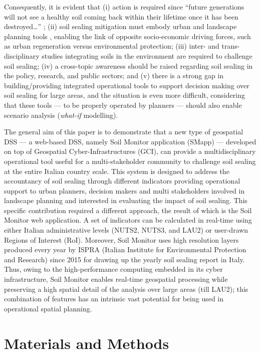 \documentclass[APA,LATO1COL,doublespace]{WileyNJD-v2}
\begin{document}
Consequently, it is evident that 
(i) action is required since ``future generations will not see a healthy soil coming back within their lifetime once it has been destroyed\dots'' \citep{SWD12}; 
(ii) soil sealing mitigation must embody urban and landscape planning tools \citep{Artmann14}, enabling the link of opposite socio-economic driving forces, such as urban regeneration versus environmental protection; 
(iii) inter- and trans-disciplinary studies integrating soils in the environment are required to challenge soil sealing;
(iv) a cross-topic awareness should be raised regarding soil sealing in the policy, research, and public sectors; 
and (v) there is a strong gap in building/providing integrated operational tools to support decision making over soil sealing for large areas, and the situation is even more difficult, considering that these tools --- to be properly operated by planners --- should also enable scenario analysis (\textit{what-if} modelling).

The general aim of this paper is to demonstrate that a new type of geospatial DSS --- a web-based DSS, namely Soil Monitor application (SMapp) --- developed on top of Geospatial Cyber-Infrastructures (GCI), can provide a multidisciplinary operational tool useful for a multi-stakeholder community to challenge soil sealing at the entire Italian country scale. 
This system is designed to address the accountancy of soil sealing through different indicators providing operational support to urban planners, decision makers and multi stakeholders involved in landscape planning and interested in evaluating the impact of soil sealing. 
This specific contribution required a different approach, the result of which is the Soil Monitor web application. 
A set of indicators can be calculated in real-time using either Italian administrative levels (NUTS2, NUTS3, and LAU2) or user-drawn Regions of Interest (RoI). 
Moreover, Soil Monitor uses high resolution layers produced every year by ISPRA (Italian Institute for Environmental Protection and Research) since 2015 for drawing up the yearly soil sealing report in Italy. 
Thus, owing to the high-performance computing embedded in its cyber infrastructure, Soil Monitor enables real-time geospatial processing while preserving a high spatial detail of the analysis over large areas (till LAU2); this combination of features has an intrinsic vast potential for being used in operational spatial planning. 

\section{  { Materials and Methods } }
\end{document}
